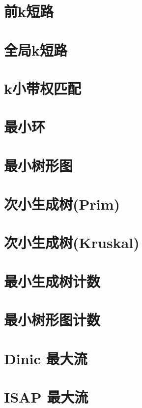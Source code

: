 \section{前k短路}
\raggedbottom
\hrulefill
\section{全局k短路}
\raggedbottom
\hrulefill
\section{k小带权匹配}
\raggedbottom
\hrulefill
\section{最小环}
\raggedbottom
\hrulefill
\section{最小树形图}
\raggedbottom
\hrulefill
\section{次小生成树(Prim)}
\raggedbottom
\hrulefill
\section{次小生成树(Kruskal)}
\raggedbottom
\hrulefill
\section{最小生成树计数}
\raggedbottom
\hrulefill
\section{最小树形图计数}
\raggedbottom
\hrulefill
\section{Dinic 最大流}
\raggedbottom
\hrulefill
\section{	ISAP 最大流}
\raggedbottom
\hrulefill
